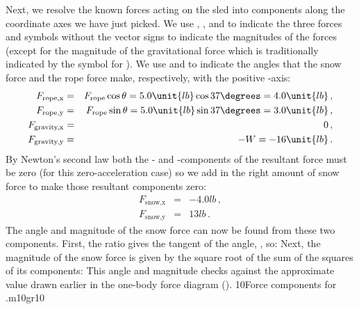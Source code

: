 {Next, we resolve the known forces acting on the sled into components
along the coordinate axes we have just picked.
We use , , and  to
indicate the three forces and symbols without the vector signs to
indicate the magnitudes of the forces (except for the magnitude of the
gravitational force which is traditionally indicated by the symbol
 for ).
We use \m{\theta} and \m{\phi} to indicate the angles that the snow force
and the rope force make, respectively, with the positive -axis:
%
\begin{eqnarray*}
%
F_\text{rope,x} & = & F_\text{rope} \cos{\theta} = 5.0\unit{lb} \cos{37\degrees} = 4.0\unit{lb}\,,\\
%
F_\text{rope,y} & = & F_\text{rope} \sin{\theta} = 5.0\unit{lb} \sin{37\degrees} = 3.0\unit{lb}\,,\\
%
F_\text{gravity,x} & = & 0 \,,\\
%
F_\text{gravity,y} & = & -W = -16\unit{lb}\,.
%
\end{eqnarray*}
%
By Newton's second law both the - and -components of the
resultant force must be zero (for this zero-acceleration case) so we
add in the right amount of snow force to make those resultant components zero:
%
\begin{eqnarray*}
%
F_\text{snow,x} & = & -4.0\unit{lb}\,,\\
%
F_\text{snow,y} & = & 13\unit{lb}\,.
%
\end{eqnarray*}
%
The angle and magnitude of the snow force can now be found from
these two components.
First, the ratio  gives the tangent of the angle, \m{\tan{\phi}},
so:
%
\newsavebox{\hlp}
%
Next, the magnitude of the snow force is given by the square root
of the sum of the squares of its components:
%
%
This angle and magnitude checks against the approximate value drawn
earlier in the one-body force diagram ().
%
 {10}{Force components for .}{m10gr10}

}
